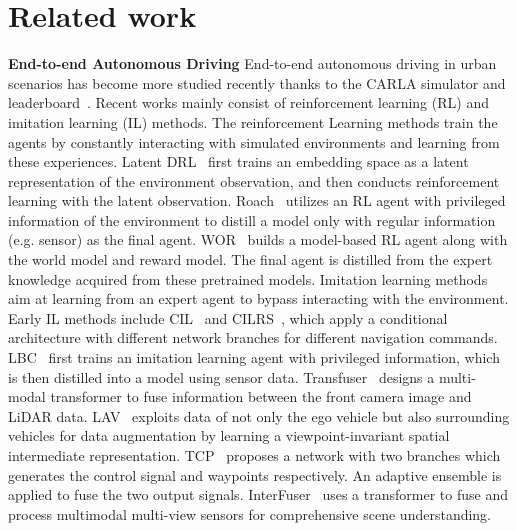 \documentclass[10pt,twocolumn,letterpaper]{article}
\begin{document}
\section{Related work}
\label{sec: related work}
\noindent\textbf{End-to-end Autonomous Driving}
End-to-end autonomous driving in urban scenarios has become more studied recently thanks to the CARLA simulator and leaderboard~\cite{dosovitskiy2017carla}. 
Recent works mainly consist of reinforcement learning (RL) and imitation learning (IL) methods. 
The reinforcement Learning methods train the agents by constantly interacting with simulated environments and learning from these experiences. 
Latent DRL~\cite{toromanoff2020end} first trains an embedding space as a latent representation of the environment observation, and then conducts reinforcement learning with the latent observation. 
Roach~\cite{zhang2021end} utilizes an RL agent with privileged information of the environment to distill a model only with regular information (e.g. sensor) as the final agent.
WOR~\cite{chen2021learning} builds a model-based RL agent along with the world model and reward model. The final agent is distilled from the expert knowledge acquired from these pretrained models.
Imitation learning methods aim at learning from an expert agent to bypass interacting with the environment. Early IL methods include CIL~\cite{codevilla2018end} and CILRS~\cite{codevilla2019exploring}, which apply a conditional architecture with different network branches for different navigation commands. 
LBC~\cite{chen2020learning} first trains an imitation learning agent with privileged information, which is then distilled into a model using sensor data.
Transfuser~\cite{prakash2021multi, chitta2022transfuser} designs a multi-modal transformer to fuse information between the front camera image and LiDAR data.
LAV~\cite{chen2022learning} exploits data of not only the ego vehicle but also surrounding vehicles for data augmentation by learning a viewpoint-invariant spatial intermediate representation. 
TCP~\cite{wu2022trajectory} proposes a network with two branches which generates the control signal and waypoints respectively. An adaptive ensemble is applied to fuse the two output signals.
InterFuser~\cite{shao2022safety} uses a transformer to fuse and process multimodal multi-view sensors for comprehensive scene understanding.
\end{document}
